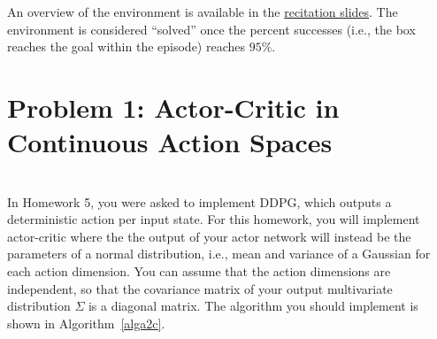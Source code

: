 \documentclass[12pt]{article}
\begin{document}
An overview of the environment is available in the \href{https://docs.google.com/presentation/d/1ueiyyXN_v7h_4GGa4NtMBau0Du1wpZstS3pfJIds37U/edit?usp=sharing}{recitation slides}.  The environment is considered ``solved'' once the percent successes (i.e., the box reaches the goal within the episode) reaches $95\%$. 



\section*{Problem 1: Actor-Critic in Continuous Action Spaces}
\ \\
In Homework 5, you were asked to implement DDPG, which outputs a deterministic action per input state.  For this homework, you will implement actor-critic where the the output of your actor network will instead be the parameters of a normal distribution, i.e., mean and variance of a Gaussian for each action dimension.  You can assume that the action dimensions are independent, so that the covariance matrix of your output multivariate distribution $\Sigma$ is a diagonal matrix.  The algorithm you should implement is shown in Algorithm~\ref{alga2c}.  
\end{document}
